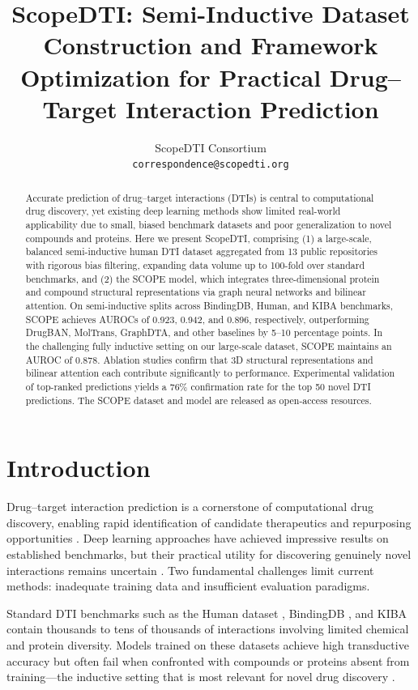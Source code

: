 \documentclass[11pt]{article}
\title{ScopeDTI: Semi-Inductive Dataset Construction and Framework Optimization for Practical Drug--Target Interaction Prediction}
\author{%
  ScopeDTI Consortium\\
  \texttt{correspondence@scopedti.org}
}
\date{}
\begin{document}
\maketitle

\begin{abstract}
Accurate prediction of drug--target interactions (DTIs) is central to computational drug discovery, yet existing deep learning methods show limited real-world applicability due to small, biased benchmark datasets and poor generalization to novel compounds and proteins. Here we present ScopeDTI, comprising (1) a large-scale, balanced semi-inductive human DTI dataset aggregated from 13 public repositories with rigorous bias filtering, expanding data volume up to 100-fold over standard benchmarks, and (2) the SCOPE model, which integrates three-dimensional protein and compound structural representations via graph neural networks and bilinear attention. On semi-inductive splits across BindingDB, Human, and KIBA benchmarks, SCOPE achieves AUROCs of 0.923, 0.942, and 0.896, respectively, outperforming DrugBAN, MolTrans, GraphDTA, and other baselines by 5--10 percentage points. In the challenging fully inductive setting on our large-scale dataset, SCOPE maintains an AUROC of 0.878. Ablation studies confirm that 3D structural representations and bilinear attention each contribute significantly to performance. Experimental validation of top-ranked predictions yields a 76\% confirmation rate for the top 50 novel DTI predictions. The SCOPE dataset and model are released as open-access resources.
\end{abstract}

\section{Introduction}

Drug--target interaction prediction is a cornerstone of computational drug discovery, enabling rapid identification of candidate therapeutics and repurposing opportunities \citep{chen2018}. Deep learning approaches have achieved impressive results on established benchmarks, but their practical utility for discovering genuinely novel interactions remains uncertain \citep{huang2021}. Two fundamental challenges limit current methods: inadequate training data and insufficient evaluation paradigms.

Standard DTI benchmarks such as the Human dataset \citep{liu2015}, BindingDB \citep{gilson2016}, and KIBA \citep{tang2014} contain thousands to tens of thousands of interactions involving limited chemical and protein diversity. Models trained on these datasets achieve high transductive accuracy but often fail when confronted with compounds or proteins absent from training---the inductive setting that is most relevant for novel drug discovery \citep{luo2017}.
\end{document}
